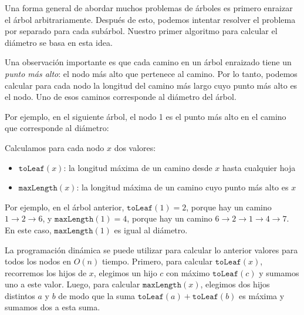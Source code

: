 Una forma general de abordar muchos problemas de árboles
es primero enraizar el árbol arbitrariamente.
Después de esto, podemos intentar resolver el problema
por separado para cada subárbol.
Nuestro primer algoritmo para calcular el diámetro
se basa en esta idea.

Una observación importante es que cada camino
en un árbol enraizado tiene un \emph{punto más alto}:
el nodo más alto que pertenece al camino.
Por lo tanto, podemos calcular para cada nodo la longitud
del camino más largo cuyo punto más alto es el nodo.
Uno de esos caminos corresponde al diámetro del árbol.

Por ejemplo, en el siguiente árbol,
el nodo 1 es el punto más alto en el camino
que corresponde al diámetro:
\begin{center}
\end{center}

Calculamos para cada nodo $x$ dos valores:
\begin{itemize}
\item $\texttt{toLeaf}(x)$: la longitud máxima de un camino desde $x$ hasta cualquier hoja
\item $\texttt{maxLength}(x)$: la longitud máxima de un camino
cuyo punto más alto es $x$
\end{itemize}
Por ejemplo, en el árbol anterior,
$\texttt{toLeaf}(1)=2$, porque hay un camino
$1 \rightarrow 2 \rightarrow 6$,
y $\texttt{maxLength}(1)=4$,
porque hay un camino
$6 \rightarrow 2 \rightarrow 1 \rightarrow 4 \rightarrow 7$.
En este caso, $\texttt{maxLength}(1)$ es igual al diámetro.

La programación dinámica se puede utilizar para calcular lo anterior
valores para todos los nodos en $O(n)$ tiempo.
Primero, para calcular $\texttt{toLeaf}(x)$,
recorremos los hijos de $x$,
elegimos un hijo $c$ con máximo $\texttt{toLeaf}(c)$
y sumamos uno a este valor.
Luego, para calcular $\texttt{maxLength}(x)$,
elegimos dos hijos distintos $a$ y $b$
de modo que la suma $\texttt{toLeaf}(a)+\texttt{toLeaf}(b)$
es máxima y sumamos dos a esta suma.

